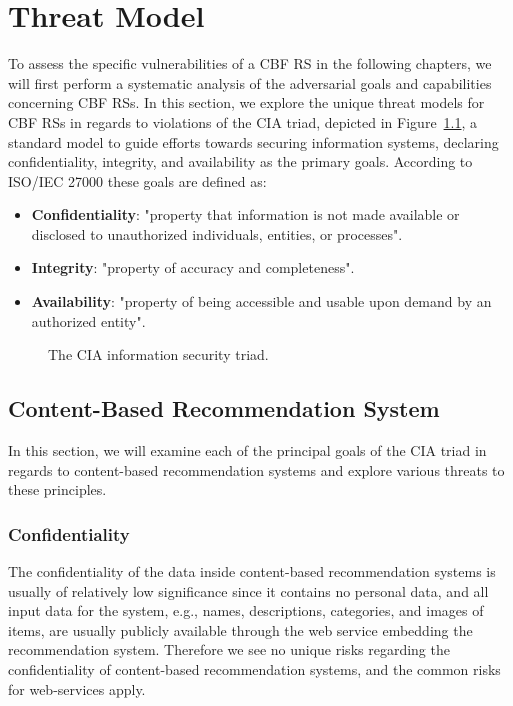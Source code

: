 \chapter{Threat Model}
\label{chp:threat-model}
To assess the specific vulnerabilities of a \ac{CBF} \ac{RS} in the following chapters, we will first perform a systematic analysis of the adversarial goals and capabilities concerning \ac{CBF} \acp{RS}. In this section, we explore the unique threat models for \ac{CBF} \acp{RS} in regards to violations of the CIA triad, depicted in Figure~\ref{fig:cia}, a standard model to guide efforts towards securing information systems, declaring confidentiality, integrity, and availability as the primary goals. According to ISO/IEC 27000 \parencite{iso27000} these goals are defined as:
\begin{itemize}
	\item \textbf{Confidentiality}: "property that information is not made available or disclosed to unauthorized individuals, entities, or processes".
	\item \textbf{Integrity}: "property of accuracy and completeness".
	\item \textbf{Availability}: "property of being accessible and usable upon demand by an authorized entity".
\end{itemize}
\begin{figure}[H]
	\centering
	
	\caption{The CIA information security triad.}
	\label{fig:cia}
\end{figure}
\pagebreak
\section{Content-Based Recommendation System}
In this section, we will examine each of the principal goals of the CIA triad in regards to content-based recommendation systems and explore various threats to these principles.
\subsection{Confidentiality}
The confidentiality of the data inside content-based recommendation systems is usually of relatively low significance since it contains no personal data, and all input data for the system, e.g., names, descriptions, categories, and images of items, are usually publicly available through the web service embedding the recommendation system. Therefore we see no unique risks regarding the confidentiality of content-based recommendation systems, and the common risks for web-services apply.

